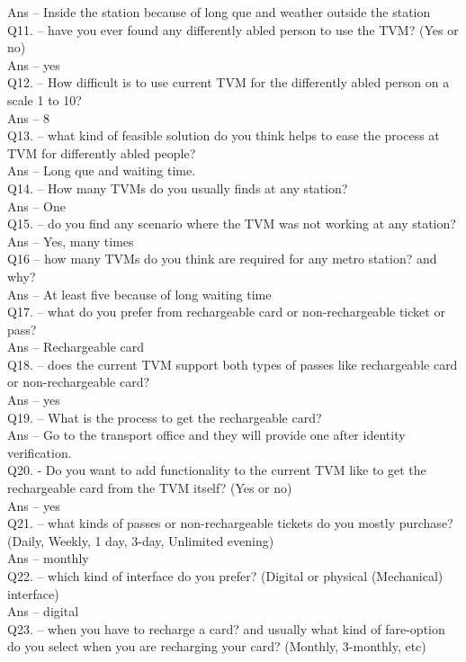\documentclass[a4paper, 11pt]{report}
\begin{document}
Ans – Inside the station because of long que and weather outside the station\\
Q11. – have you ever found any differently abled person to use the TVM? (Yes or no) \\
Ans – yes\\
Q12. – How difficult is to use current TVM for the differently abled person on a scale 1 to 10? \\
Ans – 8\\
Q13. – what kind of feasible solution do you think helps to ease the process at TVM for differently abled people? \\
Ans – Long que and waiting time. \\
Q14. – How many TVMs do you usually finds at any station? \\
Ans – One \\
Q15. – do you find any scenario where the TVM was not working at any station? \\
Ans – Yes, many times\\
Q16 – how many TVMs do you think are required for any metro station? and why? \\
Ans – At least five because of long waiting time\\
Q17. – what do you prefer from rechargeable card or non-rechargeable ticket or pass? \\
Ans – Rechargeable card\\
Q18. – does the current TVM support both types of passes like rechargeable card or non-rechargeable card? \\
Ans – yes\\
Q19. – What is the process to get the rechargeable card? \\
Ans – Go to the transport office and they will provide one after identity verification. \\
Q20. -  Do you want to add functionality to the current TVM like to get the rechargeable card from the TVM itself? (Yes or no) \\
Ans – yes\\
Q21. – what kinds of passes or non-rechargeable tickets do you mostly purchase? (Daily, Weekly, 1 day, 3-day, Unlimited evening) \\
Ans – monthly\\
Q22. – which kind of interface do you prefer? (Digital or physical (Mechanical) interface) \\
Ans – digital\\
Q23. – when you have to recharge a card? and usually what kind of fare-option do you select when you are recharging your card? (Monthly, 3-monthly, etc) \\
\end{document}
